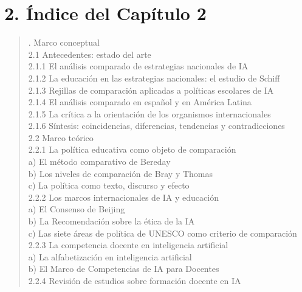 \documentclass[12pt,letterpaper]{article}
\newenvironment{indice}{\begin{quote}\footnotesize\setstretch{1.1}\ttfamily}{\end{quote}}
\begin{document}
\section*{2. Índice del Capítulo 2}

\begin{indice}
2. Marco conceptual\\
\hspace*{1em}2.1 Antecedentes: estado del arte\\
\hspace*{2em}2.1.1 El análisis comparado de estrategias nacionales de IA\\
\hspace*{2em}2.1.2 La educación en las estrategias nacionales: el estudio de Schiff\\
\hspace*{2em}2.1.3 Rejillas de comparación aplicadas a políticas escolares de IA\\
\hspace*{2em}2.1.4 El análisis comparado en español y en América Latina\\
\hspace*{2em}2.1.5 La crítica a la orientación de los organismos internacionales\\
\hspace*{2em}2.1.6 Síntesis: coincidencias, diferencias, tendencias y contradicciones\\
\hspace*{1em}2.2 Marco teórico\\
\hspace*{2em}2.2.1 La política educativa como objeto de comparación\\
\hspace*{3em}a) El método comparativo de Bereday\\
\hspace*{3em}b) Los niveles de comparación de Bray y Thomas\\
\hspace*{3em}c) La política como texto, discurso y efecto\\
\hspace*{2em}2.2.2 Los marcos internacionales de IA y educación\\
\hspace*{3em}a) El Consenso de Beijing\\
\hspace*{3em}b) La Recomendación sobre la ética de la IA\\
\hspace*{3em}c) Las siete áreas de política de UNESCO como criterio de comparación\\
\hspace*{2em}2.2.3 La competencia docente en inteligencia artificial\\
\hspace*{3em}a) La alfabetización en inteligencia artificial\\
\hspace*{3em}b) El Marco de Competencias de IA para Docentes\\
\hspace*{2em}2.2.4 Revisión de estudios sobre formación docente en IA
\end{indice}
\end{document}
